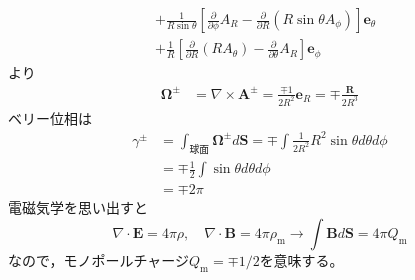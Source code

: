 \documentclass[a4paper,11pt,dvipdfmx]{jsarticle}
\theoremstyle{definition}%
\numberwithin{equation}{section}%
\numberwithin{theorem}{section} %
\begin{document}
\begin{enumerate}[1.]
\begin{align}
    & + \frac{1}{R\sin\theta}\left[\frac{\partial}{\partial\phi}A_R-\frac{\partial}{\partial R}(R\sin\theta A_\phi)\right]\bm{e}_\theta \\
    & +\frac{1}{R}\left[\frac{\partial}{\partial R}(RA_\theta)-\frac{\partial}{\partial\theta}A_R\right]\bm{e}_\phi
  \end{align}
  より
  \begin{align}
    \bm{\Omega}^\pm&=\nabla\times\bm{A}^\pm=\frac{\mp 1}{2R^2}\bm{e}_R=\mp\frac{\bm{R}}{2R^3}\tag{1.2.10}
  \end{align}
  ベリー位相は
  \begin{align}
    \gamma^\pm&=\int_{\text{球面}}\bm{\Omega}^\pm d\bm{S}=\mp\int\frac{1}{2R^2}R^2\sin\theta d\theta d\phi \\
    &=\mp \frac{1}{2} \int\sin\theta d\theta d\phi \\
    &=\mp2\pi \tag{1.2.11}
  \end{align}
  電磁気学を思い出すと
  \begin{equation}
    \nabla \cdot\bm{E}=4\pi\rho, \quad \nabla\cdot\bm{B}=4\pi\rho_{\text{m}}\to\int\bm{B}d\bm{S}=4\pi Q_{\text{m}}
  \end{equation}
  なので，モノポールチャージ\(Q_{\text{m}}=\mp1/2\)を意味する。


\end{enumerate}
\end{document}
